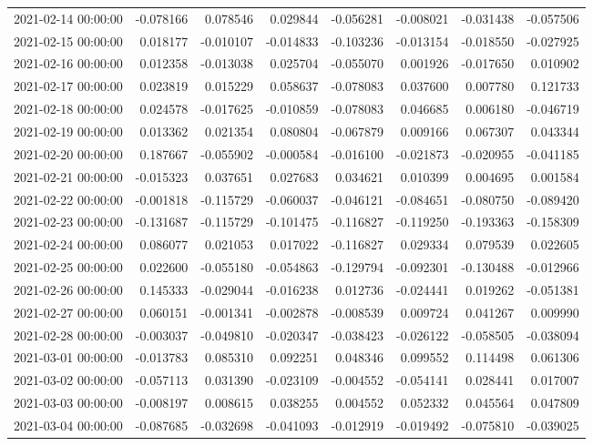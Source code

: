 \begin{tabular}{lrrrrrrr}
2021-02-14 00:00:00 & -0.078166 & 0.078546 & 0.029844 & -0.056281 & -0.008021 & -0.031438 & -0.057506 \\
2021-02-15 00:00:00 & 0.018177 & -0.010107 & -0.014833 & -0.103236 & -0.013154 & -0.018550 & -0.027925 \\
2021-02-16 00:00:00 & 0.012358 & -0.013038 & 0.025704 & -0.055070 & 0.001926 & -0.017650 & 0.010902 \\
2021-02-17 00:00:00 & 0.023819 & 0.015229 & 0.058637 & -0.078083 & 0.037600 & 0.007780 & 0.121733 \\
2021-02-18 00:00:00 & 0.024578 & -0.017625 & -0.010859 & -0.078083 & 0.046685 & 0.006180 & -0.046719 \\
2021-02-19 00:00:00 & 0.013362 & 0.021354 & 0.080804 & -0.067879 & 0.009166 & 0.067307 & 0.043344 \\
2021-02-20 00:00:00 & 0.187667 & -0.055902 & -0.000584 & -0.016100 & -0.021873 & -0.020955 & -0.041185 \\
2021-02-21 00:00:00 & -0.015323 & 0.037651 & 0.027683 & 0.034621 & 0.010399 & 0.004695 & 0.001584 \\
2021-02-22 00:00:00 & -0.001818 & -0.115729 & -0.060037 & -0.046121 & -0.084651 & -0.080750 & -0.089420 \\
2021-02-23 00:00:00 & -0.131687 & -0.115729 & -0.101475 & -0.116827 & -0.119250 & -0.193363 & -0.158309 \\
2021-02-24 00:00:00 & 0.086077 & 0.021053 & 0.017022 & -0.116827 & 0.029334 & 0.079539 & 0.022605 \\
2021-02-25 00:00:00 & 0.022600 & -0.055180 & -0.054863 & -0.129794 & -0.092301 & -0.130488 & -0.012966 \\
2021-02-26 00:00:00 & 0.145333 & -0.029044 & -0.016238 & 0.012736 & -0.024441 & 0.019262 & -0.051381 \\
2021-02-27 00:00:00 & 0.060151 & -0.001341 & -0.002878 & -0.008539 & 0.009724 & 0.041267 & 0.009990 \\
2021-02-28 00:00:00 & -0.003037 & -0.049810 & -0.020347 & -0.038423 & -0.026122 & -0.058505 & -0.038094 \\
2021-03-01 00:00:00 & -0.013783 & 0.085310 & 0.092251 & 0.048346 & 0.099552 & 0.114498 & 0.061306 \\
2021-03-02 00:00:00 & -0.057113 & 0.031390 & -0.023109 & -0.004552 & -0.054141 & 0.028441 & 0.017007 \\
2021-03-03 00:00:00 & -0.008197 & 0.008615 & 0.038255 & 0.004552 & 0.052332 & 0.045564 & 0.047809 \\
2021-03-04 00:00:00 & -0.087685 & -0.032698 & -0.041093 & -0.012919 & -0.019492 & -0.075810 & -0.039025 \\

\end{tabular}
